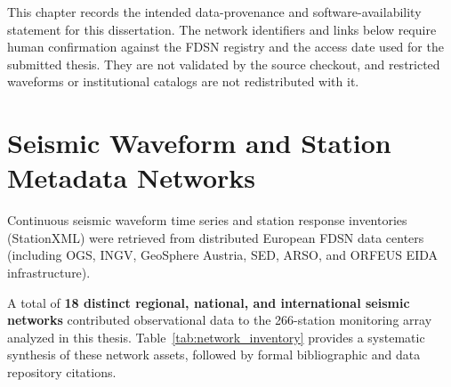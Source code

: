 
\label{chap:data_resources}

This chapter records the intended data-provenance and
software-availability statement for this dissertation. The network
identifiers and links below require human confirmation against the
\ac{FDSN} registry and the access date used for the submitted thesis.
They are not validated by the source checkout, and restricted
waveforms or institutional catalogs are not redistributed with it.

\section*{Seismic Waveform and Station Metadata Networks}
Continuous seismic waveform time series and station response
inventories (StationXML) were retrieved from distributed European
\ac{FDSN} data centers (including \ac{OGS}, \ac{INGV}, GeoSphere Austria,
\acf{SED}, \acf{ARSO}, and \acf{ORFEUS} \ac{EIDA} infrastructure).

A total of \textbf{18 distinct regional, national, and international
seismic networks} contributed observational data to the 266-station
monitoring array analyzed in this thesis.
Table~\ref{tab:network_inventory} provides a systematic synthesis of
these network assets, followed by formal bibliographic and data
repository citations.

